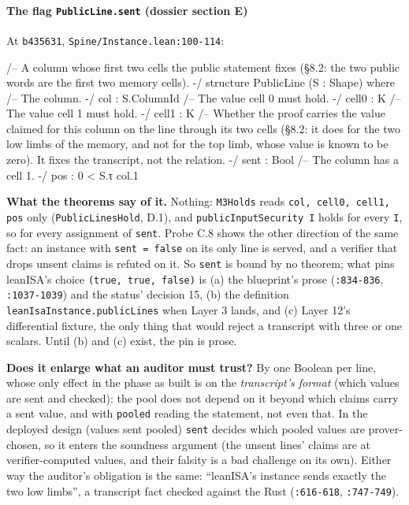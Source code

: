 \paragraph{The flag \texttt{PublicLine.sent} (dossier section E)}\label{sec:gen-pubinput-E}

At \texttt{b435631}, \texttt{Spine/\allowbreak{}Instance.\allowbreak{}lean:100-{}114}:

\begin{leancode}
/-- A column whose first two cells the public statement fixes (§8.2: the two public words are
the first two memory cells). -/
structure PublicLine (S : Shape) where
  /-- The column. -/
  col : S.ColumnId
  /-- The value cell 0 must hold. -/
  cell0 : K
  /-- The value cell 1 must hold. -/
  cell1 : K
  /-- Whether the proof carries the value claimed for this column on the line through its two
  cells (§8.2: it does for the two low limbs of the memory, and not for the top limb, whose
  value is known to be zero). It fixes the transcript, not the relation. -/
  sent : Bool
  /-- The column has a cell 1. -/
  pos : 0 < S.τ col.1
\end{leancode}

\textbf{What the theorems say of it.} Nothing: \texttt{M3Holds} reads \texttt{col,\allowbreak{} cell0,\allowbreak{} cell1,\allowbreak{} pos} only (\texttt{PublicLinesHold}, D.1), and \texttt{publicInputSecurity I} holds for every \texttt{I}, so for every assignment of \texttt{sent}. Probe C.8 shows the other direction of the same fact: an instance with \texttt{sent = false} on its only line is served, and a verifier that drops unsent claims is refuted on it. So \texttt{sent} is bound by no theorem; what pins leanISA's choice \texttt{(\allowbreak{}true,\allowbreak{} true,\allowbreak{} false)} is (a) the blueprint's prose (\texttt{:834-{}836}, \texttt{:1037-{}1039}) and the status' decision 15, (b) the definition \texttt{leanIsaInstance.\allowbreak{}publicLines} when Layer 3 lands, and (c) Layer 12's differential fixture, the only thing that would reject a transcript with three or one scalars. Until (b) and (c) exist, the pin is prose.

\textbf{Does it enlarge what an auditor must trust?} By one Boolean per line, whose only effect in the phase as built is on the \emph{transcript's format} (which values are sent and checked): the pool does not depend on it beyond which claims carry a sent value, and with \texttt{pooled} reading the statement, not even that. In the deployed design (values sent pooled) \texttt{sent} decides which pooled values are prover-chosen, so it enters the soundness argument (the unsent lines' claims are at verifier-computed values, and their falsity is a bad challenge on its own). Either way the auditor's obligation is the same: \enquote{leanISA's instance sends exactly the two low limbs}, a transcript fact checked against the Rust (\texttt{:616-{}618}, \texttt{:747-{}749}).

